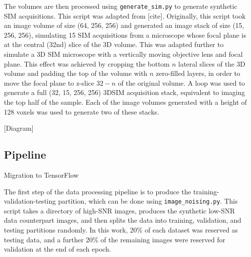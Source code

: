 \documentclass[12pt]{article}
\begin{document}
The volumes are then processed using \texttt{generate\_sim.py} to generate synthetic SIM acquisitions.
This script was adapted from [cite].
Originally, this script took an image volume of size (64, 256, 256) and generated an image stack of size (15, 256, 256),
simulating 15 SIM acquisitions from a microscope whose focal plane is at the central (32nd) slice of the 3D volume.
This was adapted further to simulate a 3D SIM microscope with a vertically moving objective lens and focal plane.
This effect was achieved by cropping the bottom $n$ lateral slices of the 3D volume and padding the top of the volume with $n$ zero-filled layers,
in order to move the focal plane to z-slice $32-n$ of the original volume.
A loop was used to generate a full (32, 15, 256, 256) 3DSIM acquisition stack,
equivalent to imaging the top half of the sample.
Each of the image volumes generated with a height of 128 voxels was used to generate two of these stacks.

[Diagram]

\subsection{Pipeline}

Migration to TensorFlow

The first step of the data processing pipeline is to produce the training-validation-testing partition,
which can be done using \texttt{image\_noising.py}.
This script takes a directory of high-SNR images, produces the synthetic low-SNR data counterpart images,
and then splits the data into training, validation, and testing partitions randomly.
In this work, 20\% of each dataset was reserved as testing data,
and a further 20\% of the remaining images were reserved for validation at the end of each epoch.
\end{document}
